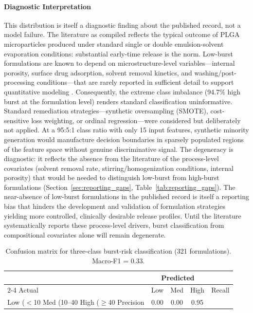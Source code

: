 \documentclass[preprint,12pt,authoryear]{elsarticle}
\begin{document}
\paragraph{Diagnostic Interpretation}
This distribution is itself a diagnostic finding about the published record, not a model failure. The literature as compiled reflects the typical outcome of PLGA microparticles produced under standard single or double emulsion-solvent evaporation conditions: substantial early-time release is the norm. Low-burst formulations are known to depend on microstructure-level variables---internal porosity, surface drug adsorption, solvent removal kinetics, and washing/post-processing conditions---that are rarely reported in sufficient detail to support quantitative modeling \citep{Yoo2020, Fredenberg2011}. Consequently, the extreme class imbalance (94.7\% high burst at the formulation level) renders standard classification uninformative. Standard remediation strategies---synthetic oversampling (SMOTE), cost-sensitive loss weighting, or ordinal regression---were considered but deliberately not applied. At a 95:5:1 class ratio with only 15 input features, synthetic minority generation would manufacture decision boundaries in sparsely populated regions of the feature space without genuine discriminative signal. The degeneracy is diagnostic: it reflects the absence from the literature of the process-level covariates (solvent removal rate, stirring/homogenization conditions, internal porosity) that would be needed to distinguish low-burst from high-burst formulations (Section~\ref{sec:reporting_gaps}, Table~\ref{tab:reporting_gaps}). The near-absence of low-burst formulations in the published record is itself a reporting bias that hinders the development and validation of formulation strategies yielding more controlled, clinically desirable release profiles. Until the literature systematically reports these process-level drivers, burst classification from compositional covariates alone will remain degenerate.


\begin{table}[H]
\centering
\caption{Confusion matrix for three-class burst-risk classification (321 formulations). Macro-F1 = 0.33.}
\label{tab:confusion_matrix}
\begin{tabular}{lccc|c}
\toprule
 & \multicolumn{3}{c}{Predicted} & \\
\cmidrule(lr){2-4}
Actual & Low & Med & High & Recall \\
\midrule
Low ($<$10%
Med (10--40%
High ($\geq$40%
\midrule
Precision & 0.00 & 0.00 & 0.95 & \\
\bottomrule
\end{tabular}
\end{table}
\end{document}
